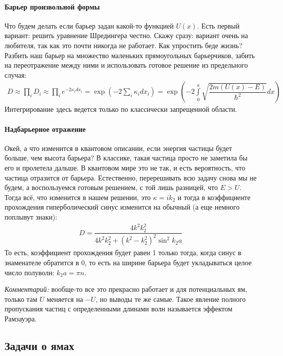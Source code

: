 \documentclass[12pt]{article}
\begin{document}
\paragraph{Барьер произвольной формы}
Что будем делать если барьер задан какой-то функцией $U(x)$. Есть первый вариант: решить уравнение Шредингера честно. Скажу сразу: вариант очень на любителя, так как это почти никогда не работает. Как упростить беде жизнь? Разбить наш барьер на множество маленьких прямоугольных барьерчиков, забить на переотражение между ними и использовать готовое решение из предельного случая:
\begin{gather}
\label{eq:sem_04_tunnel_coeff}
    D \approx \prod\limits_{i} D_i \approx \prod\limits_{i} e^{-2\kappa_i dx_i} = \exp{\left( -2\sum\limits_{i}\kappa_i dx_i \right)} = \exp{\left( -2\int\limits_{0}^{a}\sqrt{\dfrac{2m(U(x)-E)}{\hbar^2}} dx \right)}
\end{gather}
Интегрирование здесь ведется только по классически запрещенной области.

\paragraph{Надбарьерное отражение}
Окей, а что изменится в квантовом описании, если энергия частицы будет больше, чем высота барьера? В классике, такая частица просто не заметила бы его и пролетела дальше. В квантовом мире это не так, и есть вероятность, что частица отразится от барьера. Естественно, перерешивать всю задачу снова мы не будем, а воспользуемся готовым решением, с той лишь разницей, что $E>U$. Тогда  всё, что изменится в нашем решении, это $\kappa = ik_2$ и тогда в коэффициенте прохождения гиперболический синус изменится на обычный (а еще немного поплывут знаки):
\begin{gather*}
        D =  \dfrac{4k^2k_2^2}{4k^2k_2^2 + (k^2-k_2^2)^2 \sin^2{k_2 a}}
\end{gather*}
То есть, коэффициент прохождения будет равен 1 только тогда, когда синус в знаменателе обратится в 0, то есть на ширине барьера будет укладываться целое число полуволн: $k_2 a = \pi n$.

\vspace{1em} \noindent
\textit{Комментарий:} вообще-то все это прекрасно работает и для потенциальных ям, только там $U$ меняется на $-U$, но выводы те же самые. Такое явление полного пропускания частиц с определенными длинами волн называется эффектом Рамзауэра.

\subsection{Задачи о ямах}
\end{document}
